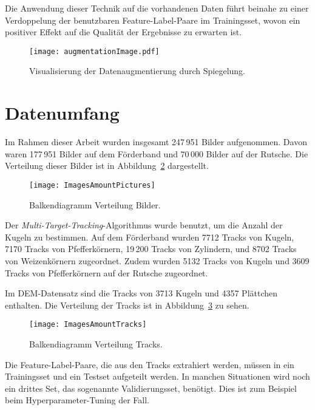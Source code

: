 Die Anwendung dieser Technik auf die vorhandenen Daten führt beinahe zu einer Verdoppelung 
der benutzbaren Feature-Label-Paare im Trainingsset, wovon ein positiver Effekt auf die Qualität der Ergebnisse zu erwarten ist.

\begin{figure}[h]
	\centering
	\texttt{[image: augmentationImage.pdf]}
	\caption{Visualisierung der Datenaugmentierung durch Spiegelung.}
	\label{fig:dataAugm}
\end{figure}



\section{Datenumfang}

Im Rahmen dieser Arbeit wurden insgesamt 247\,951 Bilder aufgenommen.
Davon waren 177\,951 Bilder auf dem Förderband und 70\,000 Bilder auf der Rutsche.
Die Verteilung dieser Bilder ist in Abbildung~\ref{fig:barPics} dargestellt.

\begin{figure}[h]
	\centering
	\texttt{[image: ImagesAmountPictures]}
	\caption{Balkendiagramm Verteilung Bilder.}
	\label{fig:barPics}
\end{figure}

Der \textit{Multi-Target-Tracking}-Algorithmus wurde benutzt, um die Anzahl der Kugeln zu bestimmen.
Auf dem Förderband wurden 7712 Tracks von Kugeln,
7170 Tracks von Pfefferkörnern,
19\,200 Tracks von Zylindern,
und 8702 Tracks von Weizenkörnern zugeordnet.
Zudem wurden 5132 Tracks von Kugeln und 3609 Tracks von Pfefferkörnern auf der Rutsche zugeordnet.

Im DEM-Datensatz sind die Tracks von 3713 Kugeln und 4357 Plättchen enthalten.
Die Verteilung der Tracks ist in Abbildung~\ref{fig:barTracks} zu sehen.

\begin{figure}[h]
	\centering
	\texttt{[image: ImagesAmountTracks]}
	\caption{Balkendiagramm Verteilung Tracks.}
	\label{fig:barTracks}
\end{figure}

Die Feature-Label-Paare, die aus den Tracks extrahiert werden, 
müssen in ein Trainingsset und ein Testset aufgeteilt werden.
In manchen Situationen wird noch ein drittes Set, das sogenannte Validierungsset, benötigt.
Dies ist zum Beispiel beim Hyperparameter-Tuning der Fall.

